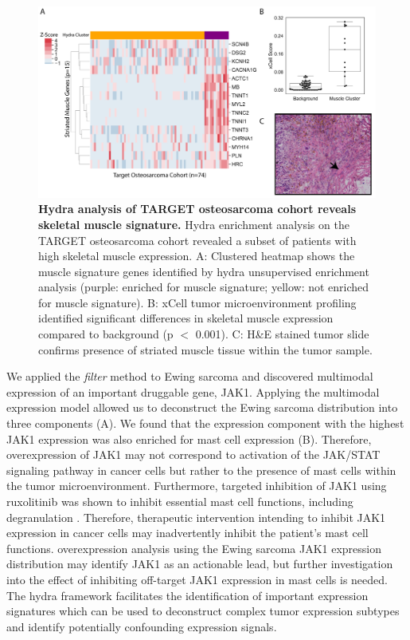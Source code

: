 \documentclass[10pt,letterpaper]{article}
\begin{document}
%
%
\begin{figure}[!h]
	\includegraphics[width=\textwidth]{img/PNG/muscle-signature-genes-2x}
	\caption{{\bf Hydra analysis of TARGET osteosarcoma cohort reveals skeletal muscle signature.}
		 Hydra enrichment analysis on the TARGET osteosarcoma cohort revealed a subset of patients with high skeletal muscle expression. A: Clustered heatmap shows the muscle signature genes identified by hydra unsupervised enrichment analysis (purple: enriched for muscle signature; yellow: not enriched for muscle signature). B: xCell tumor microenvironment profiling identified significant differences in skeletal muscle expression compared to background (p $<$ 0.001). C: H\&E stained tumor slide confirms presence of striated muscle tissue within the tumor sample.}
	\label{muscle}
\end{figure}

We applied the \textit{filter} method to Ewing sarcoma and discovered multimodal expression of an important druggable gene, JAK1. Applying the multimodal expression model allowed us to deconstruct the Ewing sarcoma distribution into three components (A). We found that the expression component with the highest JAK1 expression was also enriched for mast cell expression (B). Therefore, overexpression of JAK1 may not correspond to activation of the JAK/STAT signaling pathway in cancer cells but rather to the presence of mast cells within the tumor microenvironment. Furthermore, targeted inhibition of JAK1 using ruxolitinib was shown to inhibit essential mast cell functions, including degranulation \cite{hermansJAK1JAK2Inhibitor2018}. Therefore, therapeutic intervention intending to inhibit JAK1 expression in cancer cells may inadvertently inhibit the patient’s mast cell functions. overexpression analysis using the Ewing sarcoma JAK1 expression distribution may identify JAK1 as an actionable lead, but further investigation into the effect of inhibiting off-target JAK1 expression in mast cells is needed. The hydra framework facilitates the identification of important expression signatures which can be used to deconstruct complex tumor expression subtypes and identify potentially confounding expression signals.
\end{document}
